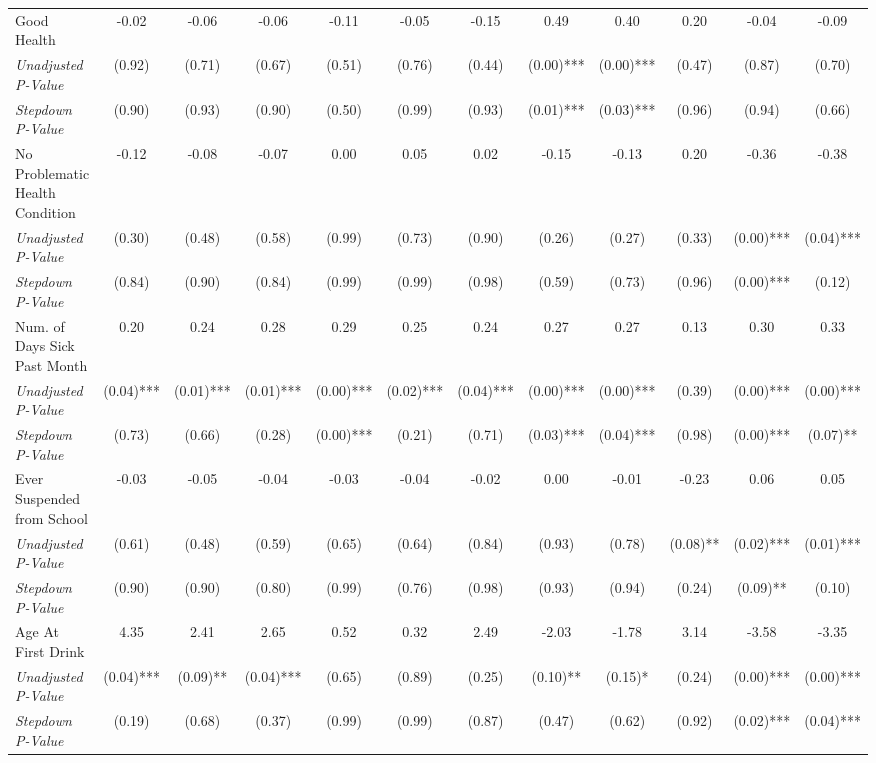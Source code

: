 \begin{tabular}{l c c c c c c c c c c c}
Good Health & -0.02 & -0.06 & -0.06 & -0.11 & -0.05 & -0.15 & 0.49 & 0.40 & 0.20 & -0.04 & -0.09 \\
\quad \textit{Unadjusted P-Value} & (0.92) & (0.71) & (0.67) & (0.51) & (0.76) & (0.44) & (0.00)*** & (0.00)*** & (0.47) & (0.87) & (0.70) \\
\quad \textit{Stepdown P-Value} & (0.90) & (0.93) & (0.90) & (0.50) & (0.99) & (0.93) & (0.01)*** & (0.03)*** & (0.96) & (0.94) & (0.66) \\
No Problematic Health Condition & -0.12 & -0.08 & -0.07 & 0.00 & 0.05 & 0.02 & -0.15 & -0.13 & 0.20 & -0.36 & -0.38 \\
\quad \textit{Unadjusted P-Value} & (0.30) & (0.48) & (0.58) & (0.99) & (0.73) & (0.90) & (0.26) & (0.27) & (0.33) & (0.00)*** & (0.04)*** \\
\quad \textit{Stepdown P-Value} & (0.84) & (0.90) & (0.84) & (0.99) & (0.99) & (0.98) & (0.59) & (0.73) & (0.96) & (0.00)*** & (0.12) \\
Num. of Days Sick Past Month & 0.20 & 0.24 & 0.28 & 0.29 & 0.25 & 0.24 & 0.27 & 0.27 & 0.13 & 0.30 & 0.33 \\
\quad \textit{Unadjusted P-Value} & (0.04)*** & (0.01)*** & (0.01)*** & (0.00)*** & (0.02)*** & (0.04)*** & (0.00)*** & (0.00)*** & (0.39) & (0.00)*** & (0.00)*** \\
\quad \textit{Stepdown P-Value} & (0.73) & (0.66) & (0.28) & (0.00)*** & (0.21) & (0.71) & (0.03)*** & (0.04)*** & (0.98) & (0.00)*** & (0.07)** \\
Ever Suspended from School & -0.03 & -0.05 & -0.04 & -0.03 & -0.04 & -0.02 & 0.00 & -0.01 & -0.23 & 0.06 & 0.05 \\
\quad \textit{Unadjusted P-Value} & (0.61) & (0.48) & (0.59) & (0.65) & (0.64) & (0.84) & (0.93) & (0.78) & (0.08)** & (0.02)*** & (0.01)*** \\
\quad \textit{Stepdown P-Value} & (0.90) & (0.90) & (0.80) & (0.99) & (0.76) & (0.98) & (0.93) & (0.94) & (0.24) & (0.09)** & (0.10) \\
Age At First Drink & 4.35 & 2.41 & 2.65 & 0.52 & 0.32 & 2.49 & -2.03 & -1.78 & 3.14 & -3.58 & -3.35 \\
\quad \textit{Unadjusted P-Value} & (0.04)*** & (0.09)** & (0.04)*** & (0.65) & (0.89) & (0.25) & (0.10)** & (0.15)* & (0.24) & (0.00)*** & (0.00)*** \\
\quad \textit{Stepdown P-Value} & (0.19) & (0.68) & (0.37) & (0.99) & (0.99) & (0.87) & (0.47) & (0.62) & (0.92) & (0.02)*** & (0.04)*** \\
\bottomrule
\end{tabular}
